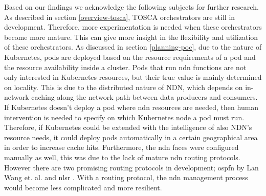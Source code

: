 


Based on our findings we acknowledge the following subjects for further research. As described in section \ref{overview-tosca}, TOSCA orchestrators are still in development. Therefore, more experimentation is needed when these orchestrators become more mature. This can give more insight in the flexibility and utilization of these orchestrators. As discussed in section \ref{planning-poc}, due to the nature of Kubernetes, pods are deployed based on the resource requirements of a pod and the resource availability inside a cluster. Pods that run \gls{ndn} functions are not only interested in Kubernetes resources, but their true value is mainly determined on locality. This is due to the distributed nature of NDN, which depends on in-network caching along the network path between data producers and consumers. If Kubernetes doesn't deploy a pod where \gls{ndn} resources are needed, then human intervention is needed to specify on which Kubernetes node a pod must run. Therefore, if Kubernetes could be extended with the intelligence of also NDN's resource needs, it could deploy pods automatically in a certain geographical area in order to increase cache hits. Furthermore, the \gls{ndn} faces were configured manually as well, this was due to the lack of mature \gls{ndn} routing protocols. However there are two promising routing protocols in development; \gls{ospfn} by Lan Wang et. al. \cite{ndn-ospfn1, ndn-ospfn2} and \gls{nlsr} \cite{nlsr}. With a routing protocol, the \gls{ndn} management process would become less complicated and more resilient.

